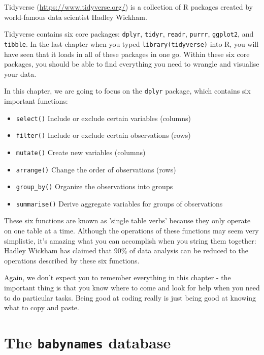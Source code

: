 \documentclass[
  oneside]{book}
\providecommand{\tightlist}{%
  \setlength{\itemsep}{0pt}\setlength{\parskip}{0pt}}
\begin{document}
Tidyverse (\url{https://www.tidyverse.org/}) is a collection of R packages created by world-famous data scientist Hadley Wickham.

Tidyverse contains six core packages: \texttt{dplyr}, \texttt{tidyr}, \texttt{readr}, \texttt{purrr}, \texttt{ggplot2}, and \texttt{tibble}. In the last chapter when you typed \texttt{library(tidyverse)} into R, you will have seen that it loads in all of these packages in one go. Within these six core packages, you should be able to find everything you need to wrangle and visualise your data.

In this chapter, we are going to focus on the \texttt{dplyr} package, which contains six important functions:

\begin{itemize}
\tightlist
\item
  \texttt{select()} Include or exclude certain variables (columns)
\item
  \texttt{filter()} Include or exclude certain observations (rows)
\item
  \texttt{mutate()} Create new variables (columns)
\item
  \texttt{arrange()} Change the order of observations (rows)
\item
  \texttt{group\_by()} Organize the observations into groups
\item
  \texttt{summarise()} Derive aggregate variables for groups of observations
\end{itemize}

These six functions are known as 'single table verbs' because they only operate on one table at a time. Although the operations of these functions may seem very simplistic, it's amazing what you can accomplish when you string them together: Hadley Wickham has claimed that 90\% of data analysis can be reduced to the operations described by these six functions.

Again, we don't expect you to remember everything in this chapter - the important thing is that you know where to come and look for help when you need to do particular tasks. Being good at coding really is just being good at knowing what to copy and paste.

\hypertarget{the-babynames-database}{%
\section{\texorpdfstring{The \texttt{babynames} database}{The babynames database}}\label{the-babynames-database}}
\end{document}
